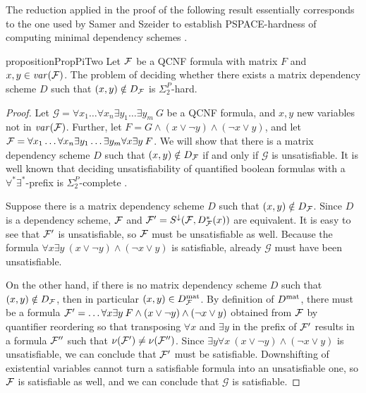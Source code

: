 \documentclass{llncs}
\newcommand{\longversion}[1]{#1}
\newcommand{\shortversion}[1]{}
\newcommand{\GGG}{\mathcal{G}} \newcommand{\HHH}{\mathcal{H}}
\newcommand{\Dmat}{D^{\text{\normalfont mat}}}
\def\hy{\hbox{-}\nobreak\hskip0pt} \newcommand{\ellipsis}{$\dots$}
\begin{document}
The reduction applied in the proof of the following result
essentially corresponds to the one used by Samer and Szeider to establish
PSPACE\hy hardness of computing minimal dependency schemes
\cite{SamerSzeider09a}.
\begin{restatable}{proposition}{PropPiTwo}\label{prop:piTwo}\shortversion{\textup{($\star$)}}
  Let $\mathcal{F}$ be a QCNF formula with matrix $F$ and $x,y \in \mathit{var}(\mathcal{F})$. The
  problem of deciding whether there exists a matrix dependency scheme $D$ such
  that $(x,y) \notin D_{\mathcal{F}}$ is $\Sigma^P_2$\hy hard.
\end{restatable}
\longversion{\begin{proof}
  Let $\GGG = \forall x_1 \dots \forall x_n \exists y_1 \dots \exists y_m\:G$
  be a QCNF formula, and $x,y$ new variables not in $\mathit{var}(\mathcal{F})$. Further, let
  $F = G \wedge (x \vee \neg y) \wedge (\neg x \vee y)$, and let $\mathcal{F} =
  \forall x_1 \dots \forall x_n \exists y_1 \dots \exists y_m \forall x
  \exists y\: F $. We will show that there is a matrix dependency scheme $D$
  such that $(x,y) \notin D_{\mathcal{F}}$ if and only if $\GGG$ is unsatisfiable. It
  is well known that deciding unsatisfiability of quantified boolean formulas
  with a $\forall^* \exists^*$\hy prefix is $\Sigma^P_2$\hy complete
  \cite{Stockmeyer76}.

  Suppose there is a matrix dependency scheme $D$ such that $(x,y) \notin
  D_{\mathcal{F}}$. Since $D$ is a dependency scheme, $\mathcal{F}$ and $\mathcal{F}' =
  S^{\downarrow}(\mathcal{F},D^*_{\mathcal{F}}(x))$ are equivalent. It is easy to see that
  $\mathcal{F}'$ is unsatisfiable, so $\mathcal{F}$ must be unsatisfiable as well. Because
  the formula $\forall x \exists y\: (x \vee \neg y) \wedge (\neg x \vee y)$ is
  satisfiable, already $\GGG$ must have been unsatisfiable.

  On the other hand, if there is no matrix dependency scheme $D$ such that
  $(x,y) \notin D_{\mathcal{F}}$, then in particular $(x,y) \in \Dmat_{\FFF}$. By
  definition of $\Dmat$, there must be a formula $\mathcal{F}' = \dots \forall x
  \exists y\: F \wedge (x \vee \neg y) \wedge (\neg x \vee y)$ obtained from
  $\mathcal{F}$ by quantifier reordering so that transposing $\forall x$ and $\exists
  y$ in the prefix of $\mathcal{F}'$ results in a formula $\mathcal{F}''$ such that
  $\nu(\mathcal{F}') \neq \nu(\mathcal{F}'')$. Since $\exists y \forall x\: (x \vee \neg y)
  \wedge (\neg x \vee y)$ is unsatisfiable, we can conclude that $\mathcal{F}'$ must
  be satisfiable. Downshifting of existential variables cannot turn a
  satisfiable formula into an unsatisfiable one, so $\mathcal{F}$ is satisfiable as
  well, and we can conclude that $\GGG$ is satisfiable.
\end{proof}
 }
\end{document}
